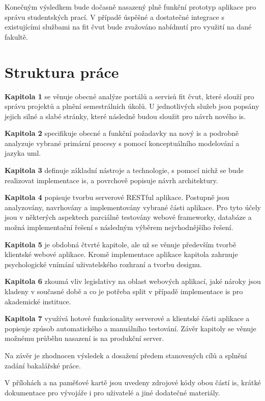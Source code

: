 Konečným výsledkem bude dočasně nasazený plně funkční prototyp aplikace pro správu studentských prací. V případě úspěšné a dostatečné integrace s existujícími službami na \gls{fit} \gls{čvut} bude zvažováno nabídnutí pro využití na dané fakultě.



\clearpage
\section{Struktura práce}

\textbf{Kapitola 1} se věnuje obecné analýze portálů a servisů \gls{fit} \gls{čvut}, které slouží pro správu projektů a plnění semestrálních úkolů. U jednotlivých služeb jsou popsány jejich silné a slabé stránky, které následně budou sloužit pro návrh nového \gls{is}.

\textbf{Kapitola 2} specifikuje obecné a funkční požadavky na nový \gls{is} a podrobně analyzuje vybrané primární procesy s pomocí konceptuálního modelování a jazyka \gls{uml}.

\textbf{Kapitola 3} definuje základní nástroje a technologie, s pomocí nichž se bude realizovat implementace \gls{is}, a povrchově popisuje návrh architektury.

\textbf{Kapitola 4} popisuje tvorbu serverové RESTful aplikace. Postupně jsou analyzovány, navrhovány a implementovány vybrané části aplikace. Pro tyto účely jsou v některých aspektech parciálně testovány webové frameworky, databáze a možná implementační řešení s následným výběrem nejvhodnějšího řešení.

\textbf{Kapitola 5} je obdobná čtvrté kapitole, ale už se věnuje především tvorbě klientské webové aplikace. Kromě implementace aplikace kapitola zahrnuje psychologické vnímání uživatelského rozhraní a tvorbu designu.

\textbf{Kapitola 6} zkoumá vliv legislativy na oblast webových aplikací, jaké nároky jsou kladeny v současné době a co je potřeba split v případě implementace \gls{is} pro akademické instituce.

\textbf{Kapitola 7} využívá hotové funkcionality serverové a klientské části aplikace a popisuje způsob automatického a manuálního testování. Závěr kapitoly se věnuje možnému průběhu nasazení \gls{is} na produkční server.

Na závěr je zhodnocen výsledek a dosažení předem stanovených cílů a splnění zadání bakalářské práce.

V přílohách a na paměťové kartě jsou uvedeny zdrojové kódy obou částí \gls{is}, krátké dokumentace pro vývojáře i pro uživatelé a jiné dodatečné materiály.